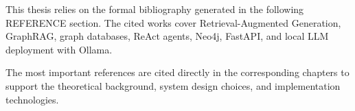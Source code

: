 \documentclass[../main.tex]{subfiles}
\begin{document}
This thesis relies on the formal bibliography generated in the following REFERENCE section. The cited works cover Retrieval-Augmented Generation, GraphRAG, graph databases, ReAct agents, Neo4j, FastAPI, and local LLM deployment with Ollama.

The most important references are cited directly in the corresponding chapters to support the theoretical background, system design choices, and implementation technologies.
\end{document}
